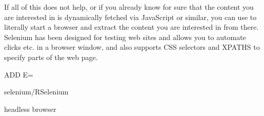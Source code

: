 If all of this does not help, or if you already know for sure that the content you are interested in is dynamically fetched via JavaScript or similar, you can use  to literally start a browser and extract the content you are interested in from there. Selenium has been designed for testing web sites and allows you to automate clicks etc. in a browser window, and also supports CSS selectors and XPATHS to specify parts of the web page.

ADD E=

selenium/RSelenium


headless browser
